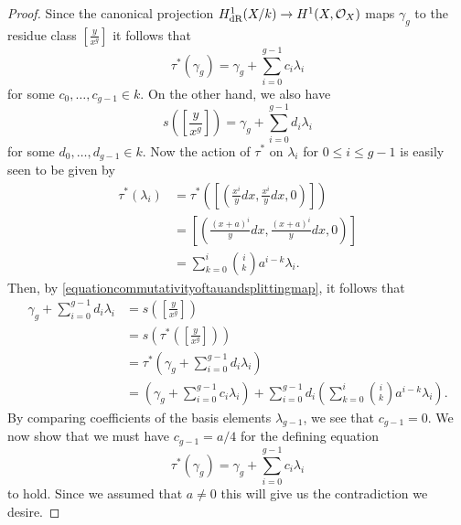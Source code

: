 \begin{proof}
    Since the canonical projection $H_{\text {dR}}^1(X/k) \rightarrow H^1(X,\mathcal{O}_X)$ maps $\gamma_g$ to the residue class $\left[ \frac{y}{x^g} \right]$ it follows that
        \[
        \tau^*(\gamma_g) = \gamma_g + \sum_{i=0}^{g-1} c_i\lambda_i
        \]
    for some $c_0, \ldots, c_{g-1} \in k$.
    On the other hand, we also have
        \[
        s\left( \left[ \frac{y}{x^g} \right] \right)  = \gamma_g + \sum_{i=0}^{g-1}d_i \lambda_i
        \]
    for some $d_0, \ldots, d_{g-1} \in k$.
    Now the action of $\tau^*$ on $\lambda_i$ for $0 \leq i \leq g-1$ is easily seen to be given by
        \begin{align*}
        \tau^*(\lambda_i) & = \tau^*\left( \left[ \left( \frac{x^i}{y}dx, \frac{x^i}{y}dx, 0\right) \right] \right) \\
        & = \left[ \left( \frac{(x+a)^i}{y}dx, \frac{(x+a)^i}{y}dx, 0 \right) \right] \\
        & = \sum_{k=0}^i \binom{i}{k} a^{i-k} \lambda_i.
        \end{align*}
    Then, by \eqref{equationcommutativityoftauandsplittingmap}, it follows that
        \begin{align*}
        \gamma_g + \sum_{i=0}^{g-1} d_i\lambda_i & = s \left( \left[ \frac{y}{x^g} \right] \right) \\
        & = s \left( \tau^*\left( \left[ \frac{y}{x^g} \right] \right) \right) \\
        & = \tau^* \left( \gamma_g + \sum_{i=0}^{g-1} d_i \lambda_i \right) \\
        & = \left( \gamma_g + \sum_{i=0}^{g-1} c_i \lambda_i \right) + \sum_{i=0}^{g-1} d_i \left( \sum_{k = 0}^i \binom{i}{k} a^{i-k} \lambda_i \right).
        \end{align*}
    By comparing coefficients of the basis elements $\lambda_{g-1}$, we see that $c_{g-1} = 0$.
    We now show that we must have $c_{g-1} = a/4$ for the defining equation
        \[
        \tau^*(\gamma_g) = \gamma_g + \sum_{i=0}^{g-1} c_i \lambda_i
        \]
    to hold.
    Since we assumed that $a \neq 0$ this will give us the contradiction we desire.


\end{proof}
